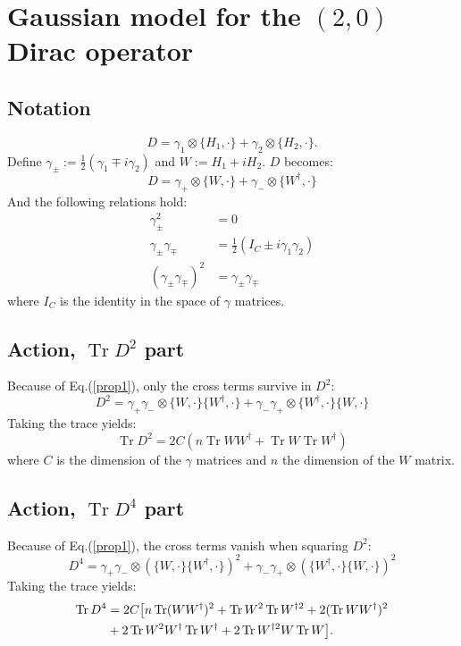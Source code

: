 \documentclass[12pt,a4paper]{article}
\DeclareMathOperator{\Tr}{Tr}
\begin{document}
\section{Gaussian model for the $(2,0)$ Dirac operator}
\subsection{Notation}
\begin{equation}
D = \gamma_1 \otimes \{H_1, \cdot \} + \gamma_2 \otimes \{H_2, \cdot \}.
\end{equation}
Define $\gamma_{\pm} := \frac{1}{2}(\gamma_1 \mp i \gamma_2)$ and $W := H_1 + i H_2$. $D$ becomes:
\begin{equation}
D = \gamma_+ \otimes \{ W, \cdot \} + \gamma_- \otimes \{ W^\dagger, \cdot \}
\end{equation}
And the following relations hold:
\begin{align}
\gamma_\pm^2 &= 0 \label{prop1} \\
\gamma_\pm \gamma_\mp &= \frac{1}{2}(I_C \pm i \gamma_1 \gamma_2) \label{prop2} \\
(\gamma_\pm \gamma_\mp)^2 &= \gamma_\pm \gamma_\mp \label{prop3}
\end{align}
where $I_C$ is the identity in the space of $\gamma$ matrices.
\subsection{Action, $\Tr D^2$ part}
Because of Eq.(\ref{prop1}), only the cross terms survive in $D^2$:
\begin{equation}
D^2 = \gamma_+ \gamma_- \otimes \{ W, \cdot \} \{ W^\dagger , \cdot \} + \gamma_- \gamma_+ \otimes \{ W^\dagger , \cdot \} \{ W , \cdot \}
\end{equation}
Taking the trace yields:
\begin{equation}
\Tr D^2 = 2 C (n \Tr W W^{\dagger} + \Tr W \Tr W^{\dagger})
\end{equation}
where $C$ is the dimension of the $\gamma$ matrices and $n$ the dimension of the $W$ matrix.
\subsection{Action, $\Tr D^4$ part}
Because of Eq.(\ref{prop1}), the cross terms vanish when squaring $D^2$:
\begin{equation}
D^4 =  \gamma_+ \gamma_- \otimes (\{ W, \cdot \} \{ W^\dagger , \cdot \})^2 + \gamma_- \gamma_+ \otimes (\{ W^\dagger , \cdot \} \{ W , \cdot \})^2
\end{equation}
Taking the trace yields:
\begin{align}
\Tr D^4 &= 2 C \big[ n \Tr(W W^\dagger)^2 + \Tr W^2 \Tr W^{\dagger 2} + 2 (\Tr W W^\dagger)^2 \notag \\ 
&+ 2 \Tr W^2 W^\dagger \Tr W^\dagger + 2 \Tr W^{\dagger 2} W \Tr W \big].
\end{align}
\end{document}
